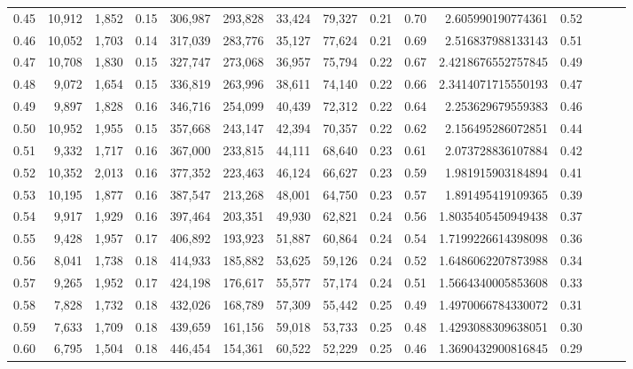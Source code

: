 \begin{tabular}{rrrrrrrrrrrrrrr}
0.45 &  10,912 &  1,852 &  0.15 &  306,987 &  293,828 &   33,424 &   79,327 &  0.21 &  0.70 &    2.605990190774361 &      0.52 \\
0.46 &  10,052 &  1,703 &  0.14 &  317,039 &  283,776 &   35,127 &   77,624 &  0.21 &  0.69 &    2.516837988133143 &      0.51 \\
0.47 &  10,708 &  1,830 &  0.15 &  327,747 &  273,068 &   36,957 &   75,794 &  0.22 &  0.67 &   2.4218676552757845 &      0.49 \\
0.48 &   9,072 &  1,654 &  0.15 &  336,819 &  263,996 &   38,611 &   74,140 &  0.22 &  0.66 &   2.3414071715550193 &      0.47 \\
0.49 &   9,897 &  1,828 &  0.16 &  346,716 &  254,099 &   40,439 &   72,312 &  0.22 &  0.64 &    2.253629679559383 &      0.46 \\
0.50 &  10,952 &  1,955 &  0.15 &  357,668 &  243,147 &   42,394 &   70,357 &  0.22 &  0.62 &    2.156495286072851 &      0.44 \\
0.51 &   9,332 &  1,717 &  0.16 &  367,000 &  233,815 &   44,111 &   68,640 &  0.23 &  0.61 &    2.073728836107884 &      0.42 \\
0.52 &  10,352 &  2,013 &  0.16 &  377,352 &  223,463 &   46,124 &   66,627 &  0.23 &  0.59 &    1.981915903184894 &      0.41 \\
0.53 &  10,195 &  1,877 &  0.16 &  387,547 &  213,268 &   48,001 &   64,750 &  0.23 &  0.57 &    1.891495419109365 &      0.39 \\
0.54 &   9,917 &  1,929 &  0.16 &  397,464 &  203,351 &   49,930 &   62,821 &  0.24 &  0.56 &   1.8035405450949438 &      0.37 \\
0.55 &   9,428 &  1,957 &  0.17 &  406,892 &  193,923 &   51,887 &   60,864 &  0.24 &  0.54 &   1.7199226614398098 &      0.36 \\
0.56 &   8,041 &  1,738 &  0.18 &  414,933 &  185,882 &   53,625 &   59,126 &  0.24 &  0.52 &   1.6486062207873988 &      0.34 \\
0.57 &   9,265 &  1,952 &  0.17 &  424,198 &  176,617 &   55,577 &   57,174 &  0.24 &  0.51 &   1.5664340005853608 &      0.33 \\
0.58 &   7,828 &  1,732 &  0.18 &  432,026 &  168,789 &   57,309 &   55,442 &  0.25 &  0.49 &   1.4970066784330072 &      0.31 \\
0.59 &   7,633 &  1,709 &  0.18 &  439,659 &  161,156 &   59,018 &   53,733 &  0.25 &  0.48 &   1.4293088309638051 &      0.30 \\
0.60 &   6,795 &  1,504 &  0.18 &  446,454 &  154,361 &   60,522 &   52,229 &  0.25 &  0.46 &   1.3690432900816845 &      0.29 \\

\end{tabular}

